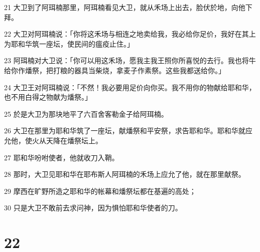 \par 21 大卫到了阿珥楠那里，阿珥楠看见大卫，就从禾场上出去，脸伏於地，向他下拜。
\par 22 大卫对阿珥楠说：「你将这禾场与相连之地卖给我，我必给你足价，我好在其上为耶和华筑一座坛，使民间的瘟疫止住。」
\par 23 阿珥楠对大卫说：「你可以用这禾场，愿我主我王照你所喜悦的去行。我也将牛给你作燔祭，把打粮的器具当柴烧，拿麦子作素祭。这些我都送给你。」
\par 24 大卫王对阿珥楠说：「不然！我必要用足价向你买。我不用你的物献给耶和华，也不用白得之物献为燔祭。」
\par 25 於是大卫为那块地平了六百舍客勒金子给阿珥楠。
\par 26 大卫在那里为耶和华筑了一座坛，献燔祭和平安祭，求告耶和华。耶和华就应允他，使火从天降在燔祭坛上。
\par 27 耶和华吩咐使者，他就收刀入鞘。
\par 28 那时，大卫见耶和华在耶布斯人阿珥楠的禾场上应允了他，就在那里献祭。
\par 29 摩西在旷野所造之耶和华的帐幕和燔祭坛都在基遍的高处；
\par 30 只是大卫不敢前去求问神，因为惧怕耶和华使者的刀。

\chapter{22}

